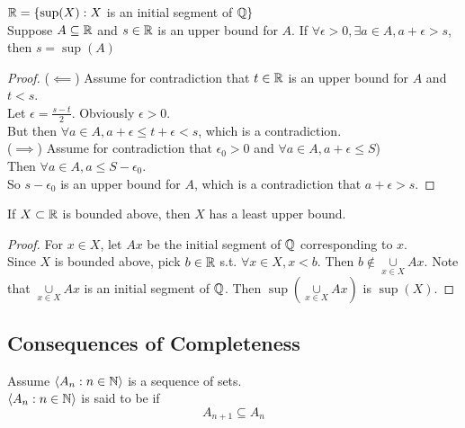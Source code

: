 \documentclass[11pt]{article}
\begin{document}
$\mathbb{R} = \{\sup(X): X$ is an initial segment of $\mathbb{Q}\}$ \\

\lemma[supremum] Suppose $A \subseteq \mathbb{R}$ and $s \in \mathbb{R}$ is an upper bound for $A$. If $\forall \epsilon > 0, \exists a \in A, a + \epsilon > s$, then $s = \sup(A)$
\begin{proof}
($\impliedby$) Assume for contradiction that $t \in \mathbb{R}$ is an upper bound for $A$ and $t < s$. \\
Let $\epsilon = \frac{s - t}{2}$. Obviously $\epsilon > 0$. \\
But then $\forall a \in A, a + \epsilon \leq t + \epsilon < s$, which is a contradiction. \\
($\implies$) Assume for contradiction that $\epsilon_0 > 0$ and $\forall a \in A, a + \epsilon \leq S$)\\
Then $\forall a \in A, a \leq S - \epsilon_0$. \\
So $s - \epsilon_0$ is an upper bound for $A$, which is a contradiction that $a + \epsilon > s$. 	
\end{proof}

 If $X \subset \mathbb{R}$ is bounded above, then $X$ has a least upper bound.
\begin{proof}
	For $x \in X$, let $Ax$ be the initial segment of $\mathbb{Q}$ corresponding to $x$. \\
	Since $X$ is bounded above, pick $b \in \mathbb{R}$ s.t. $\forall x \in X, x < b$. Then $b \notin \underset{x \in X}{\cup} Ax$. Note that $\underset{x \in X}{\cup} Ax$ is an initial segment of $\mathbb{Q}$. Then $\sup(\underset{x \in X}{\cup} Ax)$ is $\sup(X)$.
\end{proof}


\subsection{Consequences of Completeness}
Assume $\langle A_n: n \in \mathbb{N}\rangle$ is a sequence of sets. \\
$\langle A_n: n \in \mathbb{N}\rangle$ is said to be  if
$$A_{n+1} \subseteq A_n$$
\end{document}

